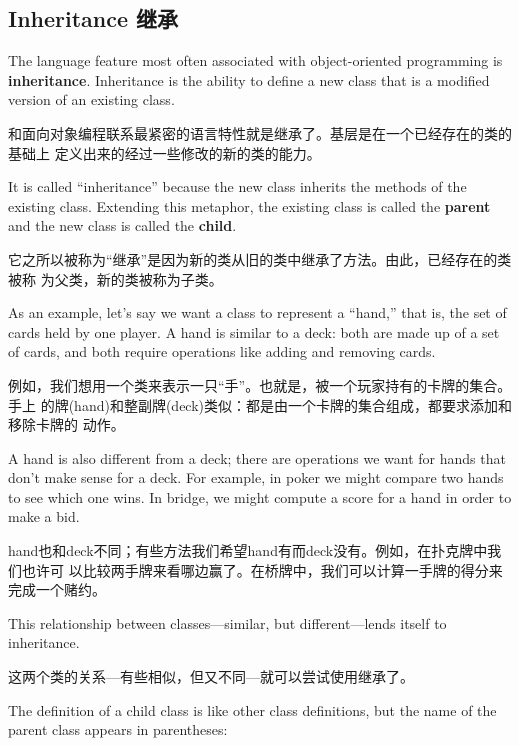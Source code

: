 \documentclass[10pt]{book}
\begin{document}
\begin{CJK}{UTF8}{gbsn}
\section{Inheritance 继承}

The language feature most often associated with object-oriented
programming is {\bf inheritance}.  Inheritance is the ability to
define a new class that is a modified version of an existing
class.

和面向对象编程联系最紧密的语言特性就是继承了。基层是在一个已经存在的类的基础上
定义出来的经过一些修改的新的类的能力。

It is called ``inheritance'' because the new class inherits the
methods of the existing class.  Extending this metaphor, the existing
class is called the {\bf parent} and the new class is
called the {\bf child}.

它之所以被称为``继承''是因为新的类从旧的类中继承了方法。由此，已经存在的类被称
为父类，新的类被称为子类。

As an example, let's say we want a class to represent a ``hand,''
that is, the set of cards held by one player.  A hand is similar to a
deck: both are made up of a set of cards, and both require operations
like adding and removing cards.

例如，我们想用一个类来表示一只``手''。也就是，被一个玩家持有的卡牌的集合。手上
的牌(hand)和整副牌(deck)类似：都是由一个卡牌的集合组成，都要求添加和移除卡牌的
动作。

A hand is also different from a deck; there are operations we want for
hands that don't make sense for a deck.  For example, in poker we
might compare two hands to see which one wins.  In bridge, we might
compute a score for a hand in order to make a bid.

hand也和deck不同；有些方法我们希望hand有而deck没有。例如，在扑克牌中我们也许可
以比较两手牌来看哪边赢了。在桥牌中，我们可以计算一手牌的得分来完成一个赌约。

This relationship between classes---similar, but different---lends
itself to inheritance.  

这两个类的关系---有些相似，但又不同---就可以尝试使用继承了。

The definition of a child class is like other class definitions,
but the name of the parent class appears in parentheses:


\end{CJK}
\end{document}

